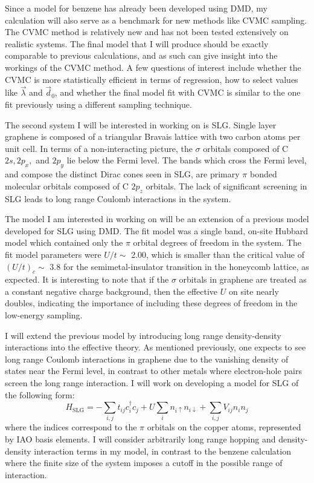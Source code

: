 \documentclass[12pt]{article}
\begin{document}
Since a model for benzene has already been developed using DMD, my calculation will also serve as a benchmark for new methods like CVMC sampling.
The CVMC method is relatively new and has not been tested extensively on realistic systems.
The final model that I will produce should be exactly comparable to previous calculations, and as such can give insight into the workings of the CVMC method.
A few questions of interest include whether the CVMC is more statistically efficient in terms of regression, how to select values like $\vec{\lambda}$ and $\vec{d}_0$, and whether the final model fit with CVMC is similar to the one fit previously using a different sampling technique.

The second system I will be interested in working on is SLG.
Single layer graphene is composed of a triangular Bravais lattice with two carbon atoms per unit cell.
In terms of a non-interacting picture, the $\sigma$ orbitals composed of C $2s, 2p_x,$ and $2p_y$ lie below the Fermi level.
The bands which cross the Fermi level, and compose the distinct Dirac cones seen in SLG, are primary $\pi$ bonded molecular orbitals composed of C $2p_z$ orbitals.
The lack of significant screening in SLG leads to long range Coulomb interactions in the system.

The model I am interested in working on will be an extension of a previous model developed for SLG using DMD.
The fit model was a single band, on-site Hubbard model which contained only the $\pi$ orbital degrees of freedom in the system.
The fit model parameters were $U/t \sim$ 2.00, which is smaller than the critical value of $(U/t)_c \sim$ 3.8 for the semimetal-insulator transition in the honeycomb lattice, as expected.
It is interesting to note that if the $\sigma$ orbitals in graphene are treated as a constant negative charge background, then the effective $U$ on site nearly doubles, indicating the importance of including these degrees of freedom in the low-energy sampling.

I will extend the previous model by introducing long range density-density interactions into the effective theory.
As mentioned previously, one expects to see long range Coulomb interactions in graphene due to the vanishing density of states near the Fermi level, in contrast to other metals where electron-hole pairs screen the long range interaction.
I will work on developing a model for SLG of the following form:
\begin{equation}
H_\text{SLG} = -\sum_{i,j} t_{ij}c_i^\dagger c_j + U \sum_i n_{i\uparrow}n_{i\downarrow}  + \sum_{i,j} V_{ij} n_i n_j
\label{Hslg}
\end{equation}
where the indices correspond to the $\pi$ orbitals on the copper atoms, represented by IAO basis elements.
I will consider arbitrarily long range hopping and density-density interaction terms in my model, in contrast to the benzene calculation where the finite size of the system imposes a cutoff in the possible range of interaction.
\end{document}
